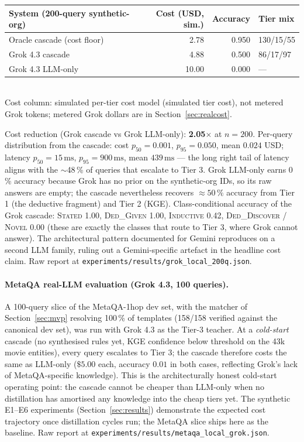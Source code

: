 \documentclass[11pt]{article}
\theoremstyle{plain}
\begin{document}
\begin{center}\small
\begin{tabular}{lrrl}
\toprule
System (200-query synthetic-org) & Cost (USD, sim.) & Accuracy & Tier mix \\
\midrule
Oracle cascade (cost floor) & 2.78  & 0.950 & 130/15/55 \\
Grok 4.3 cascade            & 4.88  & 0.500 &  86/17/97 \\
Grok 4.3 LLM-only           & 10.00 & 0.000 &     ---   \\
\bottomrule
\end{tabular}\\[3pt]
{\footnotesize Cost column: simulated per-tier cost model (simulated tier cost),
not metered Grok tokens; metered Grok dollars are in Section~\ref{sec:realcost}.}
\end{center}

\noindent Cost reduction (Grok cascade vs Grok LLM-only):
\textbf{2.05}$\times$ at $n=200$.  Per-query distribution from the
cascade: cost $p_{50}=0.001$, $p_{95}=0.050$, mean $0.024$ USD;
latency $p_{50}=15\,\textrm{ms}$, $p_{95}=900\,\textrm{ms}$, mean
$439\,\textrm{ms}$ --- the long right tail of latency aligns with the
$\sim$48\,\% of queries that escalate to Tier 3.  Grok LLM-only
earns 0\,\% accuracy because Grok has no prior on the synthetic-org
IDs, so its raw answers are empty; the cascade nevertheless
recovers $\approx 50\,\%$ accuracy from Tier 1 (the deductive
fragment) and Tier 2 (KGE).  Class-conditional accuracy of the
Grok cascade: \textsc{Stated} 1.00, \textsc{Ded\_Given} 1.00,
\textsc{Inductive} 0.42, \textsc{Ded\_Discover} / \textsc{Novel}
0.00 (these are exactly the classes that route to Tier 3, where
Grok cannot answer).  The architectural pattern documented for
Gemini reproduces on a second LLM family, ruling out a
Gemini-specific artefact in the headline cost claim.  Raw report
at \texttt{experiments/results/grok\_local\_200q.json}.

\paragraph{MetaQA real-LLM evaluation (Grok 4.3, 100 queries).}
A 100-query slice of the MetaQA-1hop dev set, with the matcher of
Section~\ref{sec:mvp} resolving 100\,\% of templates (158/158
verified against the canonical dev set), was run with Grok 4.3 as
the Tier-3 teacher.  At a \emph{cold-start} cascade (no synthesised
rules yet, KGE confidence below threshold on the 43k movie
entities), every query escalates to Tier 3; the cascade therefore
costs the same as LLM-only ($\$5.00$ each, accuracy $0.01$ in both
cases, reflecting Grok's lack of MetaQA-specific knowledge).  This
is the architecturally honest cold-start operating point: the
cascade cannot be cheaper than LLM-only when no distillation has
amortised any knowledge into the cheap tiers yet.  The synthetic
E1--E6 experiments (Section~\ref{sec:results}) demonstrate the
expected cost trajectory once distillation cycles run; the MetaQA
slice ships here as the baseline.  Raw report at
\texttt{experiments/results/metaqa\_local\_grok.json}.
\end{document}
